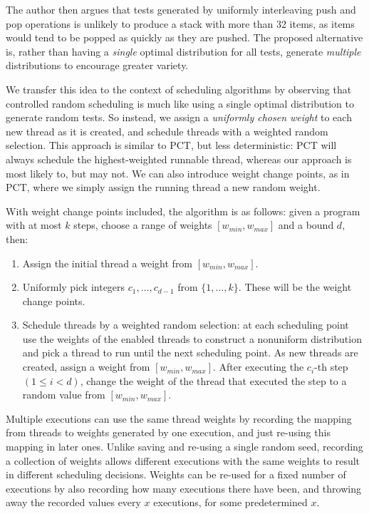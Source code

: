 The author then argues that tests generated by uniformly interleaving push and
pop operations is unlikely to produce a stack with more than 32 items, as items
would tend to be popped as quickly as they are pushed.  The proposed alternative
is, rather than having a \emph{single} optimal distribution for all tests,
generate \emph{multiple} distributions to encourage greater variety.

We transfer this idea to the context of scheduling algorithms by
observing that controlled random scheduling is much like using a
single optimal distribution to generate random tests.  So instead, we
assign a \emph{uniformly chosen weight} to each new thread as it is
created, and schedule threads with a weighted random selection.  This
approach is similar to PCT, but less deterministic: PCT will always
schedule the highest-weighted runnable thread, whereas our approach is
most likely to, but may not.  We can also introduce weight change
points, as in PCT, where we simply assign the running thread a new
random weight.

With weight change points included, the algorithm is as follows: given a program
with at most $k$ steps, choose a range of weights $[w_{min}, w_{max}]$ and
a bound $d$, then:

\begin{enumerate}
\item Assign the initial thread a weight from $[w_{min}, w_{max}]$.
\item Uniformly pick integers $c_1, \ldots, c_{d-1}$ from $\{1, \ldots, k\}$.
These will be the weight change points.
\item Schedule threads by a weighted random selection: at each scheduling point
use the weights of the enabled threads to construct a nonuniform distribution
and pick a thread to run until the next scheduling point.  As new threads are
created, assign a weight from $[w_{min}, w_{max}]$.  After executing
the $c_i$-th step $(1 \leq i < d)$, change the weight of the thread that
executed the step to a random value from $[w_{min}, w_{max}]$.
\end{enumerate}

Multiple executions can use the same thread weights by recording the
mapping from threads to weights generated by one execution, and just
re-using this mapping in later ones.  Unlike saving and re-using a
single random seed, recording a collection of weights allows different
executions with the same weights to result in different scheduling
decisions.  Weights can be re-used for a fixed number of executions by
also recording how many executions there have been, and throwing away
the recorded values every $x$ executions, for some predetermined $x$.

